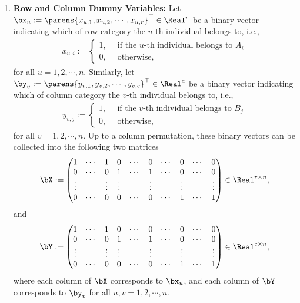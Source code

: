 \documentclass[12pt]{article}
\begin{document}
\begin{enumerate}[label=\textbf{\arabic*.}]
	\item \textbf{Row and Column Dummy Variables:} Let $\bx_u := \parens{x_{u,1}, x_{u, 2}, \cdots, x_{u,r}}^\top \in \Real^r$ be a binary vector indicating which of row category the $u$-th individual belongs to, i.e., 
	\begin{align*}
		x_{u,i} := \begin{cases}
			1, & \, \text{ if the $u$-th individual belongs to $A_i$} \\ 
			0, & \, \text{ otherwise}, 
		\end{cases}
	\end{align*}
	for all $u = 1, 2, \cdots, n$. Similarly, let $\by_v := \parens{y_{v,1}, y_{v, 2}, \cdots, y_{v,c}}^\top \in \Real^c$ be a binary vector indicating which of column category the $v$-th individual belongs to, i.e., 
	\begin{align*}
		y_{v, j} := \begin{cases}
			1, & \, \text{ if the $v$-th individual belongs to $B_j$} \\ 
			0, & \, \text{ otherwise}, 
		\end{cases}
	\end{align*}
	for all $v = 1, 2, \cdots, n$. Up to a column permutation, these binary vectors can be collected into the following two matrices 
	\begin{align*}
		\bX := \begin{pmatrix}
			1 & \cdots & 1 & 0 & \cdots & 0 & \cdots & 0 & \cdots & 0 \\ 
			0 & \cdots & 0 & 1 & \cdots & 1 & \cdots & 0 & \cdots & 0 \\ 
			\vdots &  & \vdots & \vdots &  & \vdots &  & \vdots &  & \vdots \\ 
			0 & \cdots & 0 & 0 & \cdots & 0 & \cdots & 1 & \cdots & 1 \\ 
		\end{pmatrix} \in \Real^{r \times n}, 
	\end{align*}
	and 
	\begin{align*}
		\bY := \begin{pmatrix}
			1 & \cdots & 1 & 0 & \cdots & 0 & \cdots & 0 & \cdots & 0 \\ 
			0 & \cdots & 0 & 1 & \cdots & 1 & \cdots & 0 & \cdots & 0 \\ 
			\vdots &  & \vdots & \vdots &  & \vdots &  & \vdots &  & \vdots \\ 
			0 & \cdots & 0 & 0 & \cdots & 0 & \cdots & 1 & \cdots & 1 \\ 
		\end{pmatrix} \in \Real^{c \times n}, 
	\end{align*}
	where each column of $\bX$ corresponds to $\bx_u$, and each column of $\bY$ corresponds to $\by_v$ for all $u, v = 1, 2, \cdots, n$. 
	

\end{enumerate}
\end{document}
